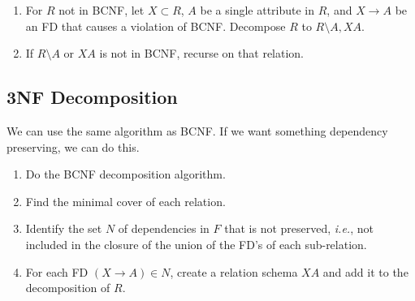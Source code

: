 \documentclass[12pt]{article}
\begin{document}
\begin{enumerate}
	\item For $R$ not in BCNF, let $X \subset R$, $A$ be a single attribute in
		$R$, and $X \to A$ be an FD that causes a violation of BCNF. Decompose
		$R$ to $R \setminus A, XA$.
	\item If $R\setminus A$ or $XA$ is not in BCNF, recurse on that relation.
\end{enumerate}

\subsection{3NF Decomposition}

We can use the same algorithm as BCNF. If we want something dependency
preserving, we can do this.
\begin{enumerate}
	\item Do the BCNF decomposition algorithm.
	\item Find the minimal cover of each relation.
	\item Identify the set $N$ of dependencies in $F$ that is not preserved,
		\textit{i.e.}, not included in the closure of the union of the FD's of
		each sub-relation.
	\item For each FD $(X \to A) \in N$, create a relation schema $XA$ and add
		it to the decomposition of $R$.
\end{enumerate}
\end{document}
